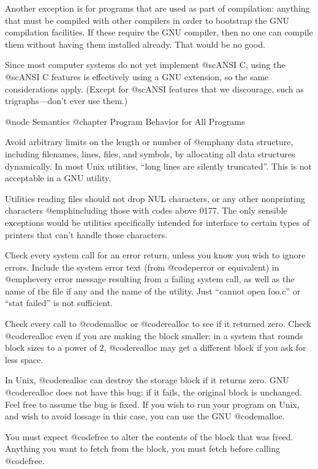 Another exception is for programs that are used as part of
compilation: anything that must be compiled with other compilers in
order to bootstrap the GNU compilation facilities.  If these require
the GNU compiler, then no one can compile them without having them
installed already.  That would be no good.

Since most computer systems do not yet implement @sc{ANSI} C, using the
@sc{ANSI} C features is effectively using a GNU extension, so the
same considerations apply.  (Except for @sc{ANSI} features that we
discourage, such as trigraphs---don't ever use them.)

@node Semantics
@chapter Program Behavior for All Programs

Avoid arbitrary limits on the length or number of @emph{any} data
structure, including filenames, lines, files, and symbols, by allocating
all data structures dynamically.  In most Unix utilities, ``long lines
are silently truncated''.  This is not acceptable in a GNU utility.

Utilities reading files should not drop NUL characters, or any other
nonprinting characters @emph{including those with codes above 0177}.  The
only sensible exceptions would be utilities specifically intended for
interface to certain types of printers that can't handle those characters.

Check every system call for an error return, unless you know you wish to
ignore errors.  Include the system error text (from @code{perror} or
equivalent) in @emph{every} error message resulting from a failing
system call, as well as the name of the file if any and the name of the
utility.  Just ``cannot open foo.c'' or ``stat failed'' is not
sufficient.

Check every call to @code{malloc} or @code{realloc} to see if it
returned zero.  Check @code{realloc} even if you are making the block
smaller; in a system that rounds block sizes to a power of 2,
@code{realloc} may get a different block if you ask for less space.

In Unix, @code{realloc} can destroy the storage block if it returns
zero.  GNU @code{realloc} does not have this bug: if it fails, the
original block is unchanged.  Feel free to assume the bug is fixed.  If
you wish to run your program on Unix, and wish to avoid lossage in this
case, you can use the GNU @code{malloc}.

You must expect @code{free} to alter the contents of the block that was
freed.  Anything you want to fetch from the block, you must fetch before
calling @code{free}.

